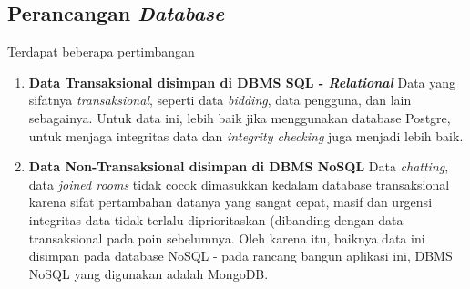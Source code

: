 
\subsection{Perancangan \textit{Database}}

	Terdapat beberapa pertimbangan 
    \\
    
    \begin{enumerate}
    \item \textbf{Data Transaksional disimpan di DBMS SQL - \textit{Relational}}
    \newline
    \indent Data yang sifatnya \textit{transaksional}, seperti data \textit{bidding}, data pengguna, dan lain sebagainya.
    Untuk data ini, lebih baik jika menggunakan database Postgre, untuk menjaga integritas data dan \textit{integrity checking} juga  menjadi lebih baik.
    \newline
    
    \item 
    \textbf{Data Non-Transaksional disimpan di DBMS NoSQL}
    \newline
    \indent Data \textit{chatting}, data \textit{joined rooms} tidak cocok dimasukkan kedalam database transaksional karena sifat pertambahan datanya yang sangat cepat, masif dan urgensi integritas data tidak terlalu diprioritaskan (dibanding dengan data transaksional pada poin sebelumnya.
    \newline
    \indent Oleh karena itu, baiknya data ini disimpan pada database NoSQL - pada rancang bangun aplikasi ini, DBMS NoSQL yang digunakan adalah MongoDB.
    \newline
   
    
    \end{enumerate}
    